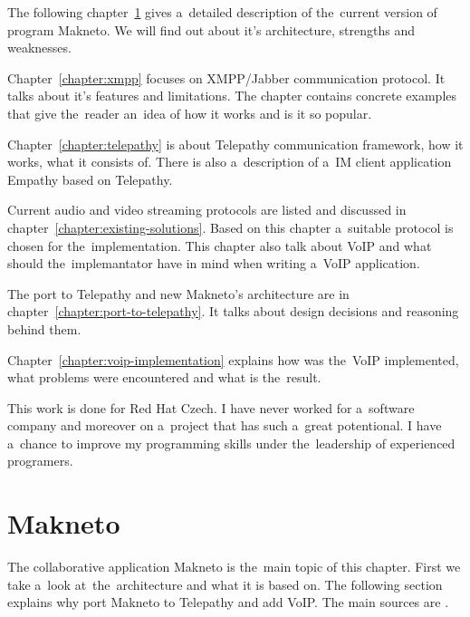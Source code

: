 The following chapter~\ref{chapter:makneto} gives a~detailed description of the~current version of program Makneto. We will find out about it's architecture, strengths and weaknesses. 

Chapter~\ref{chapter:xmpp} focuses on XMPP/Jabber communication protocol. It talks about it's features and limitations. The chapter contains concrete examples that give the~reader an~idea of how it works and is it so popular.

Chapter~\ref{chapter:telepathy} is about Telepathy communication framework, how it works, what it consists of. There is also a~description of a~IM client application Empathy based on Telepathy. 

Current audio and video streaming protocols are listed and discussed in chapter~\ref{chapter:existing-solutions}. Based on this chapter a~suitable protocol is chosen for the~implementation. This chapter also talk about VoIP and what should the~implemantator have in mind when writing a~VoIP application.

The port to Telepathy and new Makneto's architecture are in chapter~\ref{chapter:port-to-telepathy}. It talks about design decisions and reasoning behind them. 

Chapter~\ref{chapter:voip-implementation} explains how was the~VoIP implemented, what problems were encountered and what is the~result.  

This work is done for Red Hat Czech. I have never worked for a~software company and moreover on a~project that has such a~great potentional. I have a~chance to improve my programming skills under the~leadership of experienced programers.



\chapter{Makneto}\label{chapter:makneto}
The collaborative application Makneto is the~main topic of this chapter. First we take a~look at~the~architecture and what it is based on. The following section explains why port Makneto to Telepathy and add VoIP. The main sources are \cite{makneto,qtBook,SVGtiny}. 
   
